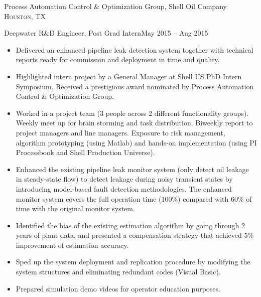 \documentclass[10pt,a4paper]{article}
\begin{document}
  \headedsection
  {Process Automation Control \& Optimization Group, Shell Oil Company}
  {\textsc{Houston, TX}}
  {
    \headedsubsection
    {Deepwater R\&D Engineer, Post Grad Intern}{May 2015 -- Aug 2015}
    {
      \begin{itemize}
      \item Delivered an enhanced pipeline leak detection system together with
        technical reports ready for commission and deployment in time and
        quality.
        
      \item Highlighted intern project by a General Manager at Shell US PhD
        Intern Symposium. Received a prestigious award nominated by Process
        Automation Control \& Optimization Group. 
        
      \item Worked in a project team (3 people across 2 different functionality
        groups). Weekly meet up for brain storming and task distribution. Biweekly
        report to project managers and line managers. Exposure to risk management,
        algorithm prototyping (using Matlab) and hands-on implementation (using PI
        Processbook and Shell Production Universe).
        
      \item Enhanced the existing pipeline leak monitor system (only detect
        oil leakage in steady-state flow) to detect leakage during noisy
        transient states by introducing model-based fault detection
        methodologies. The enhanced monitor system covers the full operation time
        (100\%) compared with 60\% of time with the original monitor system.  
        
      \item Identified the bias of the existing estimation algorithm by going
        through 2 years of plant data, and presented a compensation strategy that
        achieved 5\% improvement of estimation accuracy.
        
      \item Sped up the system deployment and replication procedure by modifying the system
        structures and eliminating redundant codes (Visual Basic).
        
      \item Prepared simulation demo videos for operator education purposes.
      \end{itemize}
    }
  }

  \spacedhrule{1em}{-0.5em}
\end{document}
